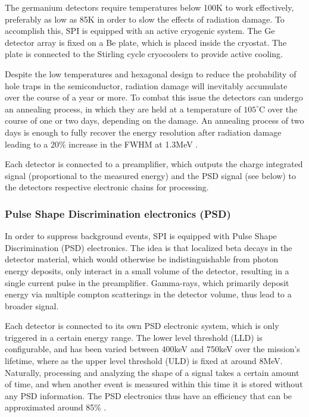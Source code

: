 \documentclass{report}
\begin{document}
The germanium detectors require temperatures below 100K to work effectively, preferably as low as 85K in order to slow the effects of radiation damage. To accomplish this, SPI is equipped with an active cryogenic system. The Ge detector array is fixed on a Be plate, which is placed inside the cryostat. The plate is connected to the Stirling cycle cryocoolers to provide active cooling. 

Despite the low temperatures and hexagonal design to reduce the probability of hole traps in the semiconductor, radiation damage will inevitably accumulate over the course of a year or more. To combat this issue the detectors can undergo an annealing process, in which they are held at a temperature of $105^\circ \text{C}$ over the course of one or two days, depending on the damage. An annealing process of two days is enough to fully recover the energy resolution after radiation damage leading to a 20\% increase in the FWHM at 1.3MeV \cite{refId0}.

Each detector is connected to a preamplifier, which outputs the charge integrated signal (proportional to the measured energy) and the PSD signal (see below) to the detectors respective electronic chains for processing.

\subsubsection*{Pulse Shape Discrimination electronics (PSD)}



In order to suppress background events, SPI is equipped with Pulse Shape Discrimination (PSD) electronics. The idea is that localized beta decays in the detector material, which would otherwise be indistinguishable from photon energy deposits, only interact in a small volume of the detector, resulting in a single current pulse in the preamplifier. Gamma-rays, which primarily deposit energy via multiple compton scatterings in the detector volume, thus lead to a broader signal. 

Each detector is connected to its own PSD electronic system, which is only triggered in a certain energy range. The lower level threshold (LLD) is configurable, and has been varied between 400keV and 750keV over the mission's lifetime, where as the upper level threshold (ULD) is fixed at around 8MeV. Naturally, processing and analyzing the shape of a signal takes a certain amount of time, and when another event is measured within this time it is stored without any PSD information. The PSD electronics thus have an efficiency that can be approximated around 85\% \cite{Roques}.
\end{document}

